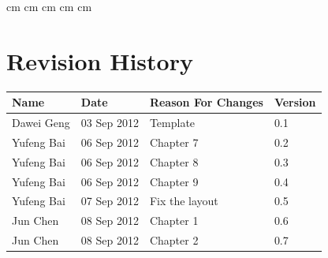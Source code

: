 \documentclass[11pt, a4paper]{report}
\begin{document}
 cm
 cm
 cm
 cm
 cm

\tableofcontents






\clearpage
\section*{Revision History}
\begin{tabular}{| l | l | l | l | }
\hline
Name      		&	Date        	&	Reason For Changes                  	  	&	Version     	\\ \hline
Dawei Geng      &	03 Sep 2012     &	Template			                  	  	&	0.1 	    	\\ \hline
Yufeng Bai         &	06 Sep 2012	&	Chapter 7						&	0.2		\\ \hline
Yufeng Bai	&	06 Sep 2012	&	Chapter 8						&	0.3		\\ \hline
Yufeng Bai	&	06 Sep 2012	&	Chapter 9						&	0.4		\\ \hline
Yufeng Bai	&	07 Sep 2012	&	Fix the layout					&	0.5		\\ \hline
Jun Chen    &   08 Sep 2012 &	Chapter 1                  	  	&	0.6     	\\ \hline
Jun Chen   	&	08 Sep 2012 &	Chapter 2                 	  	&	0.7     	\\ \hline






\end{tabular}
\clearpage
\end{document}
